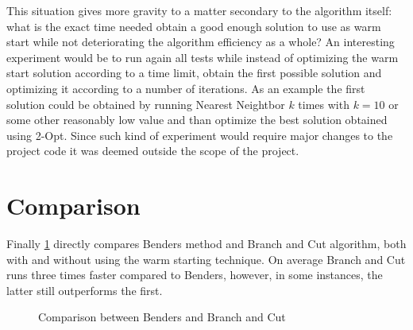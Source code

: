This situation gives more gravity to a matter secondary to the algorithm itself: what is the exact time needed obtain a good enough solution to use as warm start while not deteriorating the algorithm efficiency as a whole?
An interesting experiment would be to run again all tests while instead of optimizing the warm start solution according to a time limit, obtain the first possible solution and optimizing it according to a number of iterations.
As an example the first solution could be obtained by running Nearest Neightbor $k$ times with $k=10$ or some other reasonably low value and than optimize the best solution obtained using 2-Opt.
Since such kind of experiment would require major changes to the project code it was deemed outside the scope of the project. 

\section{Comparison}	
Finally \figurename{ \ref{fig:bendersBranchCut}} directly compares Benders method and Branch and Cut algorithm, both with and without using the warm starting technique.
On average Branch and Cut runs three times faster compared to Benders, however, in some instances, the latter still outperforms the first.

\begin{figure}[htbp]
	\centering
	\caption{Comparison between Benders and Branch and Cut\label{fig:bendersBranchCut}}
\end{figure}